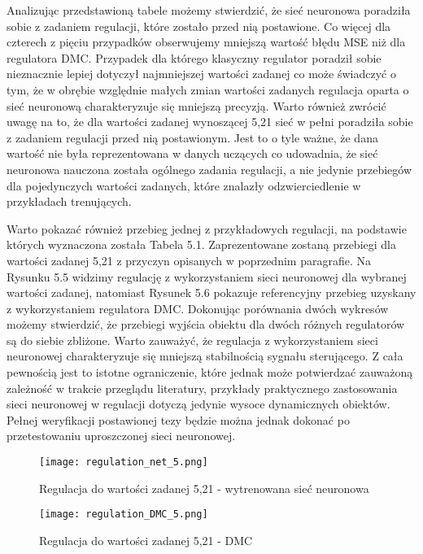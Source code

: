 Analizując przedstawioną tabele możemy stwierdzić, że sieć neuronowa poradziła sobie z zadaniem regulacji, które zostało przed nią postawione. Co więcej dla czterech z pięciu przypadków obserwujemy mniejszą wartość błędu MSE niż dla regulatora DMC. Przypadek dla którego klasyczny regulator poradził sobie nieznacznie lepiej dotyczył najmniejszej wartości zadanej co może świadczyć o tym, że w obrębie względnie małych zmian wartości zadanych regulacja oparta o sieć neuronową charakteryzuje się mniejszą precyzją. Warto również zwrócić uwagę na to, że dla wartości zadanej wynoszącej 5,21 sieć w pełni poradziła sobie z zadaniem regulacji przed nią postawionym. Jest to o tyle ważne, że dana wartość nie była reprezentowana w danych uczących co udowadnia, że sieć neuronowa nauczona została ogólnego zadania regulacji, a nie jedynie przebiegów dla pojedynczych wartości zadanych, które znalazły odzwierciedlenie w przykładach trenujących. 

\par Warto pokazać również przebieg jednej z przykładowych regulacji, na podstawie których wyznaczona została Tabela 5.1. Zaprezentowane zostaną przebiegi dla wartości zadanej 5,21 z przyczyn opisanych w poprzednim paragrafie. Na Rysunku 5.5 widzimy regulację z wykorzystaniem sieci neuronowej dla wybranej wartości zadanej, natomiast Rysunek 5.6 pokazuje referencyjny przebieg uzyskany z wykorzystaniem regulatora DMC. Dokonując porównania dwóch wykresów możemy stwierdzić, że przebiegi wyjścia obiektu dla dwóch różnych regulatorów są do siebie zbliżone. Warto zauważyć, że regulacja z wykorzystaniem sieci neuronowej charakteryzuje się mniejszą stabilnością sygnału sterującego. Z cała pewnością jest to istotne ograniczenie, które jednak może potwierdzać zauważoną zależność w trakcie przeglądu literatury, przykłady praktycznego zastosowania sieci neuronowej w regulacji dotyczą jedynie wysoce dynamicznych obiektów. Pełnej weryfikacji postawionej tezy będzie można jednak dokonać po przetestowaniu uproszczonej sieci neuronowej.

\begin{figure}[!h]
  \label{fig:sim-net-5}
  \centering \texttt{[image: regulation\_net\_5.png]}
  \caption{Regulacja do wartości zadanej 5,21 - wytrenowana sieć neuronowa}

  \vspace*{\floatsep}%

  \label{fig:sim-dmc-5}
  \centering \texttt{[image: regulation\_DMC\_5.png]}
  \caption{Regulacja do wartości zadanej 5,21 - DMC}
\end{figure}


